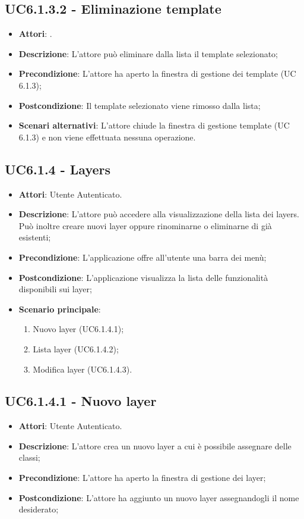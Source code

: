 \subsection{UC6.1.3.2 - Eliminazione template} 
\label{ssec:UC6.1.3.2} 
\begin{itemize} 
\item \textbf{Attori}: .
\item \textbf{Descrizione}: L'attore può eliminare dalla lista il template selezionato;
\item \textbf{Precondizione}: L'attore ha aperto la finestra di gestione dei template (UC 6.1.3);
\item \textbf{Postcondizione}: Il template selezionato viene rimosso dalla lista;
\item \textbf{Scenari alternativi}: L'attore chiude la finestra di gestione template (UC 6.1.3) e non viene effettuata nessuna operazione.
\end{itemize} 
\subsection{UC6.1.4 - Layers} 
\label{ssec:UC6.1.4} 
\begin{itemize} 
\item \textbf{Attori}: Utente Autenticato.
\item \textbf{Descrizione}: L’attore  può accedere alla visualizzazione della lista dei layers. Può inoltre creare nuovi layer oppure rinominarne o eliminarne di già esistenti;
\item \textbf{Precondizione}: L’applicazione offre all’utente una barra dei menù;
\item \textbf{Postcondizione}: L'applicazione visualizza la lista delle funzionalità disponibili sui layer;
\item \textbf{Scenario principale}: \begin{enumerate}\item Nuovo layer (UC6.1.4.1);\item Lista layer (UC6.1.4.2);\item Modifica layer (UC6.1.4.3). 
 \end{enumerate}
\end{itemize} 
\subsection{UC6.1.4.1 - Nuovo layer} 
\label{ssec:UC6.1.4.1} 
\begin{itemize} 
\item \textbf{Attori}: Utente Autenticato.
\item \textbf{Descrizione}: L'attore crea un nuovo layer a cui è possibile assegnare delle classi;
\item \textbf{Precondizione}: L'attore ha aperto la finestra di gestione dei layer;
\item \textbf{Postcondizione}: L'attore ha aggiunto un nuovo layer assegnandogli il nome desiderato;
\end{itemize} 
